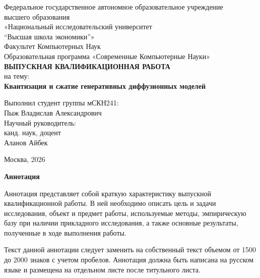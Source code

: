 \documentclass[14pt,a4paper]{extreport}
\numberwithin{figure}{chapter}
\numberwithin{table}{chapter}
\numberwithin{equation}{chapter}
\newcommand{\annotationpage}[2]{
    \clearpage
    \thispagestyle{empty}
    \begin{center}
        \textbf{#1}
    \end{center}

    #2
}
\begin{document}

\begin{titlepage}
    \begin{center}
        Федеральное государственное автономное образовательное учреждение\\
        высшего образования\\
        «Национальный исследовательский университет\\
        “Высшая школа экономики”»\\[1.5cm]

        Факультет Компьютерных Наук\\
        Образовательная программа «Современные Компьютерные Науки»\\[2.5cm]

        \textbf{ВЫПУСКНАЯ КВАЛИФИКАЦИОННАЯ РАБОТА}\\[0.5cm]

        на тему:\\[0.5cm]

        \textbf{Квантизация и сжатие генеративных диффузионных моделей}\\[2cm]
    \end{center}

    \begin{flushright}
        Выполнил студент группы мСКН241:\\
        Пыж Владислав Александрович\\[0.5cm]

        Научный руководитель:\\
        канд. наук, доцент\\
        Аланов Айбек
    \end{flushright}

    \vfill

    \begin{center}
        Москва, 2026
    \end{center}
\end{titlepage}

\annotationpage{Аннотация}{
Аннотация представляет собой краткую характеристику выпускной квалификационной работы.
В ней необходимо описать цель и задачи исследования, объект и предмет работы,
используемые методы, эмпирическую базу при наличии прикладного исследования,
а также основные результаты, полученные в ходе выполнения работы.

Текст данной аннотации следует заменить на собственный текст объемом от 1500
до 2000 знаков с учетом пробелов. Аннотация должна быть написана на русском
языке и размещена на отдельном листе после титульного листа.
}
\end{document}
